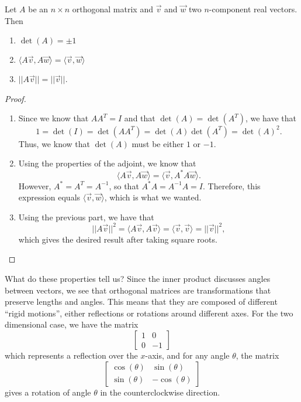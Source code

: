 \documentclass{ximera}
\begin{document}
\begin{theorem}{}
    Let $A$ be an $n\times n$ orthogonal matrix and $\vec{v}$ and $\vec{w}$ two $n$-component real vectors. Then
    \begin{enumerate}
        \item $\det(A) = \pm1$
        \item $\langle A\vec{v}, A\vec{w} \rangle = \langle \vec{v}, \vec{w} \rangle$
        \item $||A\vec{v}|| = ||\vec{v}||$.
    \end{enumerate}
\end{theorem}

\begin{proof}
    \begin{enumerate}
        \item Since we know that $AA^T = I$ and that $\det(A) = \det(A^T)$, we have that
            \[ 
                1 = \det(I) = \det(AA^T) = \det(A)\det(A^T) = \det(A)^2.
            \] 
            Thus, we know that $\det(A)$ must be either $1$ or $-1$. 
        \item Using the properties of the adjoint, we know that
            \[ 
                \langle A \vec{v}, A\vec{w} \rangle = \langle \vec{v}, A^*A\vec{w} \rangle. 
            \] 
            However, $A^* = A^T = A^{-1}$, so that $A^*A = A^{-1}A = I$. Therefore, this expression equals $\langle \vec{v}, \vec{w} \rangle$, which is what we wanted.
        \item Using the previous part, we have that
            \[ 
                ||A\vec{v}||^2 = \langle A\vec{v}, A\vec{v} \rangle = \langle \vec{v}, \vec{v} \rangle = ||\vec{v}||^2, 
            \] 
            which gives the desired result after taking square roots.
    \end{enumerate}
\end{proof}

What do these properties tell us? Since the inner product discusses angles between vectors, we see that orthogonal matrices are transformations that preserve lengths and angles. This means that they are composed of different ``rigid motions'', either reflections or rotations around different axes. For the two dimensional case, we have the matrix
\[ 
    \begin{bmatrix} 
        1 & 0 \\ 
        0 & -1 
    \end{bmatrix} 
\] 
which represents a reflection over the $x$-axis, and for any angle $\theta$, the matrix
\[ 
    \begin{bmatrix} 
        \cos(\theta) & \sin(\theta) \\ 
        \sin(\theta) & -\cos(\theta) 
    \end{bmatrix} 
\] 
gives a rotation of angle $\theta$ in the counterclockwise direction.
\end{document}

